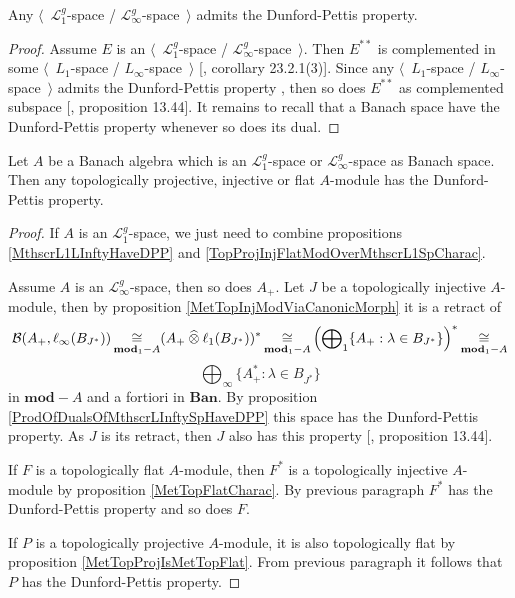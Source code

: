 \begin{proposition}\label{MthscrL1LInftyHaveDPP} Any $\langle$~$\mathscr{L}_1^g$-space / $\mathscr{L}_\infty^g$-space~$\rangle$ admits the Dunford-Pettis property.
\end{proposition}
\begin{proof} Assume $E$ is an $\langle$~$\mathscr{L}_1^g$-space / $\mathscr{L}_\infty^g$-space~$\rangle$. Then $E^{**}$ is complemented in some $\langle$~$L_1$-space / $L_\infty$-space~$\rangle$ [\cite{DefFloTensNorOpId}, corollary 23.2.1(3)]. Since any $\langle$~$L_1$-space / $L_\infty$-space~$\rangle$ admits the Dunford-Pettis property \cite{GrothApllFaiblCompSpCK}, then so does $E^{**}$ as complemented subspace [\cite{FabHabBanSpTh}, proposition 13.44]. It remains to recall that a Banach space have the Dunford-Pettis property whenever so does its dual.
\end{proof}

\begin{theorem}\label{TopProjInjFlatModOverMthscrL1OrLInftySpHaveDPP} Let $A$ be a Banach algebra which is an $\mathscr{L}_1^g$-space or $\mathscr{L}_\infty^g$-space as Banach space. Then any topologically projective, injective or flat $A$-module has the Dunford-Pettis property.
\end{theorem}
\begin{proof} If $A$ is an $\mathscr{L}_1^g$-space, we just need to combine propositions \ref{MthscrL1LInftyHaveDPP} and \ref{TopProjInjFlatModOverMthscrL1SpCharac}. 

Assume $A$ is an $\mathscr{L}_\infty^g$-space, then so does $A_+$. Let $J$ be a topologically injective $A$-module, then by proposition \ref{MetTopInjModViaCanonicMorph} it is a retract of 
$$
\mathcal{B}(A_+,\ell_\infty(B_{J^*}))\mathop{\mathbin{\cong}}\limits_{\mathbf{mod}_1-A}(A_+\mathbin{\widehat{\otimes}}\ell_1(B_{J^*}))^*\mathop{\mathbin{\cong}}\limits_{\mathbf{mod}_1-A}
\left(\bigoplus\nolimits_1\{ A_+:\lambda\in B_{J^*}\}\right)^*\mathop{\mathbin{\cong}}\limits_{\mathbf{mod}_1-A}
$$
$$
\bigoplus\nolimits_\infty\{ A_+^*:\lambda\in B_{J^*}\}
$$ 
in $\mathbf{mod}-A$ and a fortiori in $\mathbf{Ban}$. By proposition \ref{ProdOfDualsOfMthscrLInftySpHaveDPP} this space has the Dunford-Pettis property. As $J$ is its retract, then $J$ also has this property [\cite{FabHabBanSpTh}, proposition 13.44]. 

If $F$ is a topologically flat $A$-module, then $F^*$ is a topologically injective $A$-module by proposition \ref{MetTopFlatCharac}. By previous paragraph $F^*$ has the Dunford-Pettis property and so does $F$.

If $P$ is a topologically projective $A$-module, it is also topologically flat by proposition \ref{MetTopProjIsMetTopFlat}. From previous paragraph it follows that $P$ has the Dunford-Pettis property.
\end{proof}

